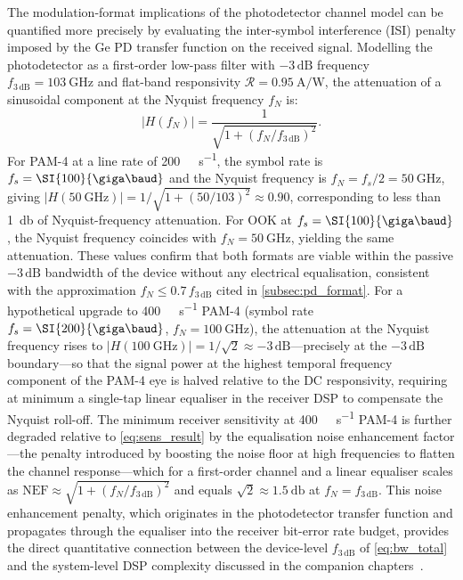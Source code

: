 The modulation-format implications of the photodetector channel model can be
quantified more precisely by evaluating the inter-symbol interference (ISI)
penalty imposed by the Ge PD transfer function on the received signal. Modelling
the photodetector as a first-order low-pass filter with $-3\,\mathrm{dB}$
frequency $f_{3\,\mathrm{dB}} = \SI{103}{\giga\hertz}$ and flat-band
responsivity $\mathcal{R} = \SI{0.95}{\ampere\per\watt}$, the attenuation of a
sinusoidal component at the Nyquist frequency $f_N$ is:
\begin{equation}
    |H(f_N)| = \frac{1}{\sqrt{1 + (f_N/f_{3\,\mathrm{dB}})^2}}.
    \label{eq:nyquist_attenuation}
\end{equation}
For PAM-4 at a line rate of \SI{200}{\giga\bit\per\second}, the symbol rate is
$f_s = \SI{100}{\giga\baud}$ and the Nyquist frequency is $f_N = f_s/2 =
\SI{50}{\giga\hertz}$, giving $|H(\SI{50}{\giga\hertz})| = 1/\sqrt{1 +
(50/103)^2} \approx 0.90$, corresponding to less than \SI{1}{\decibel} of
Nyquist-frequency attenuation. For OOK at $f_s = \SI{100}{\giga\baud}$, the
Nyquist frequency coincides with $f_N = \SI{50}{\giga\hertz}$, yielding the
same attenuation. These values confirm that both formats are viable within the
passive $-3\,\mathrm{dB}$ bandwidth of the device without any electrical
equalisation, consistent with the approximation $f_N \leq 0.7\,f_{3\,\mathrm{dB}}$
cited in \cref{subsec:pd_format}. For a hypothetical upgrade to
\SI{400}{\giga\bit\per\second} PAM-4 (symbol rate $f_s = \SI{200}{\giga\baud}$,
$f_N = \SI{100}{\giga\hertz}$), the attenuation at the Nyquist frequency rises
to $|H(\SI{100}{\giga\hertz})| = 1/\sqrt{2} \approx -3\,\mathrm{dB}$—precisely
at the $-3\,\mathrm{dB}$ boundary—so that the signal power at the highest
temporal frequency component of the PAM-4 eye is halved relative to the DC
responsivity, requiring at minimum a single-tap linear equaliser in the receiver
DSP to compensate the Nyquist roll-off. The minimum receiver sensitivity at
\SI{400}{\giga\bit\per\second} PAM-4 is further degraded relative to
\cref{eq:sens_result} by the equalisation noise enhancement factor—the penalty
introduced by boosting the noise floor at high frequencies to flatten the
channel response—which for a first-order channel and a linear equaliser scales
as $\mathrm{NEF} \approx \sqrt{1 + (f_N/f_{3\,\mathrm{dB}})^2}$ and equals
$\sqrt{2} \approx \SI{1.5}{\decibel}$ at $f_N = f_{3\,\mathrm{dB}}$. This
noise enhancement penalty, which originates in the photodetector transfer
function and propagates through the equaliser into the receiver bit-error rate
budget, provides the direct quantitative connection between the device-level
$f_{3\,\mathrm{dB}}$ of \cref{eq:bw_total} and the system-level DSP complexity
discussed in the companion chapters~\cite{Yan2024}.



